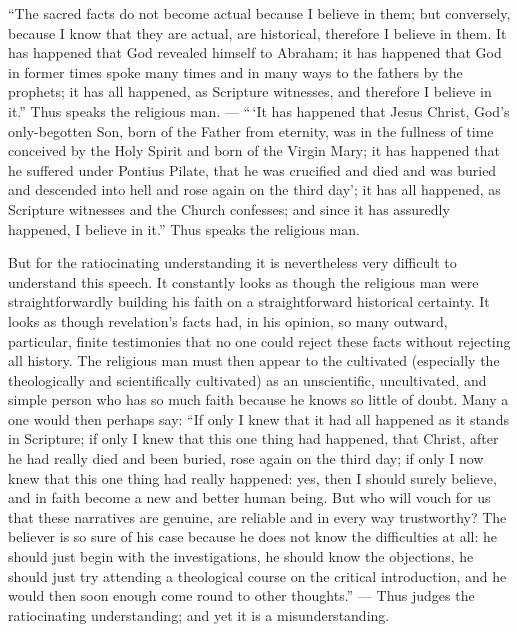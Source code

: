 \documentclass[12pt,a4paper]{book}
\begin{document}
``The sacred facts do not become actual because I believe in them; but
conversely, because I know that they are actual, are historical, therefore I
believe in them. It has happened that
God revealed himself to Abraham; it has happened that God in former times spoke
many times and in many ways to the fathers by the prophets; it has all
happened, as Scripture witnesses, and therefore I believe in it.'' Thus speaks
the religious man. --- ``\,`It has happened that Jesus Christ, God's
only-begotten Son, born of the Father from eternity, was in the fullness of
time conceived by the Holy Spirit and born of the Virgin Mary; it has happened
that he suffered under Pontius Pilate, that he was crucified and died and was
buried and descended into hell and rose again on the third day'; it has all
happened, as Scripture witnesses and the Church confesses; and since it has
assuredly happened, I believe in it.'' Thus speaks the religious man.

But for the ratiocinating understanding it is nevertheless very difficult to
understand this speech. It constantly looks as though the religious man were
straightforwardly building his faith on a straightforward historical certainty.
It looks as though revelation's facts had, in his opinion, so many outward,
particular, finite testimonies that no one could reject these facts without
rejecting all history. The religious man must then appear to the cultivated
(especially the theologically and scientifically cultivated) as an unscientific,
uncultivated, and simple person who has so much faith because he knows so little
of doubt. Many a one would then perhaps say: ``If only I knew that it had all
happened as it stands in Scripture; if only I knew that this one thing had
happened, that Christ, after he had really died and been buried, rose again on
the third day; if only I now knew that this one thing had really happened: yes,
then I should surely believe, and in faith become a new and better human being.
But who will vouch for us that these narratives are genuine, are reliable and in
every way trustworthy? The believer is so sure of his case because he does not
know the difficulties at all: he should just begin with the investigations, he
should know the objections, he should just try
attending a theological course on the critical introduction, and he would then
soon enough come round to other thoughts.'' --- Thus judges the ratiocinating
understanding; and yet it is a misunderstanding.
\end{document}
